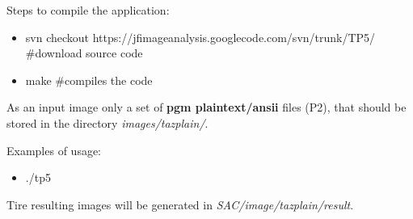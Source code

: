 \documentclass{article}
\begin{document}
	Steps to compile the application:
	
	\begin{itemize}
		\item svn checkout https://jfimageanalysis.googlecode.com/svn/trunk/TP5/ \#download source code
		\item make \#compiles the code
	\end{itemize}

	As an input image only a set of {\bf pgm plaintext/ansii} files (P2), that should be stored in the directory \emph{images/tazplain/}. 

	Examples of usage:

	\begin{itemize}
		\item ./tp5
	\end{itemize}

	Tire resulting images will be generated in \emph{SAC/image/tazplain/result}.
\end{document}
